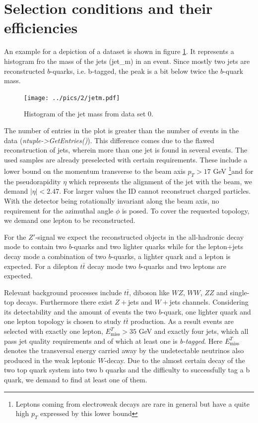 \section{Selection conditions and their efficiencies}
\label{sec:selection}
An example for a depiction of a dataset is shown in figure \ref{pic:examplePlot}. It represents a histogram fro the mass of the jets (jet\_m) in an
event. Since mostly two jets are reconstructed $b$-quarks, i.e. b-tagged, the peak is a bit below twice the $b$-quark mass. 
\begin{figure}[t]
 \texttt{[image: ../pics/2/jetm.pdf]}
 \caption{Histogram of the jet mass from data set 0.}
 \label{pic:examplePlot}
\end{figure}
The number of entries in the plot is greater than the number of events in the data (\emph{ntuple->GetEntries()}). This difference comes due to 
the flawed reconstruction of jets, wherein more than one jet is found in several events.
The used samples are already preselected with certain requirements. These include a lower bound on the momentum transverse to the beam axis $p_T>17$ GeV 
\footnote[1]{Leptons coming from electroweak
decays are rare in general but have a quite high $p_T$ expressed by this lower bound}and
for the pseudorapidity $\eta$ which represents the alignment of the jet with the beam, we demand $|\eta| < 2.47$. For larger values the ID cannot
reconstruct charged particles.
With the detector being rotationally
invariant along the beam axis, no requirement for the azimuthal angle $\phi$ is posed. To cover the requested topology, we demand one lepton to be reconstructed. 

For the $Z'$-signal we expect the reconstructed objects in the all-hadronic decay mode to contain two $b$-quarks and two lighter quarks while for the lepton+jets decay mode a combination of two $b$-quarks, a lighter quark and a lepton is expected. For a dilepton $t\bar{t}$ decay mode two $b$-quarks and two leptons are expected.

Relevant background processes include $t\bar{t}$, diboson like $WZ$, $WW$, $ZZ$ and single-top decays. Furthermore there exist $Z+$jets and 
$W+$jets channels. Considering its detectability and the amount of events the two $b$-quark, one lighter quark and one lepton topology is chosen 
to study $t\bar{t}$ production. As a result events are selected with exactly one lepton, $E^T_\text{miss} > 35$ GeV and exactly four jets, which all 
pass jet quality requirements and of which at least one is \emph{b-tagged}. Here $E^T_\text{miss}$ denotes the transversal energy carried away by
the undetectable neutrinos also produced in the weak leptonic $W$-decay. Due to the almost certain decay of the two top quark system into two 
b quarks and the difficulty to successfully tag a b quark, we demand to find at least one of them.

